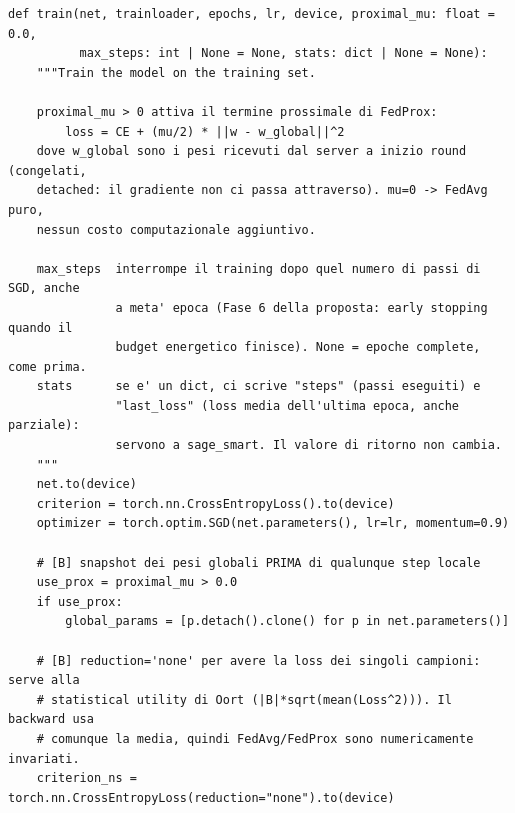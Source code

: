 \documentclass[11pt,a4paper]{article}
\begin{document}
\begin{lstlisting}[style=py,firstnumber=5,caption={\texttt{tesifl/tesiFL/task.py}, lines 5--80}]
def train(net, trainloader, epochs, lr, device, proximal_mu: float = 0.0,
          max_steps: int | None = None, stats: dict | None = None):
    """Train the model on the training set.

    proximal_mu > 0 attiva il termine prossimale di FedProx:
        loss = CE + (mu/2) * ||w - w_global||^2
    dove w_global sono i pesi ricevuti dal server a inizio round (congelati,
    detached: il gradiente non ci passa attraverso). mu=0 -> FedAvg puro,
    nessun costo computazionale aggiuntivo.

    max_steps  interrompe il training dopo quel numero di passi di SGD, anche
               a meta' epoca (Fase 6 della proposta: early stopping quando il
               budget energetico finisce). None = epoche complete, come prima.
    stats      se e' un dict, ci scrive "steps" (passi eseguiti) e
               "last_loss" (loss media dell'ultima epoca, anche parziale):
               servono a sage_smart. Il valore di ritorno non cambia.
    """
    net.to(device)
    criterion = torch.nn.CrossEntropyLoss().to(device)
    optimizer = torch.optim.SGD(net.parameters(), lr=lr, momentum=0.9)

    # [B] snapshot dei pesi globali PRIMA di qualunque step locale
    use_prox = proximal_mu > 0.0
    if use_prox:
        global_params = [p.detach().clone() for p in net.parameters()]

    # [B] reduction='none' per avere la loss dei singoli campioni: serve alla
    # statistical utility di Oort (|B|*sqrt(mean(Loss^2))). Il backward usa
    # comunque la media, quindi FedAvg/FedProx sono numericamente invariati.
    criterion_ns = torch.nn.CrossEntropyLoss(reduction="none").to(device)


\end{lstlisting}
\end{document}

